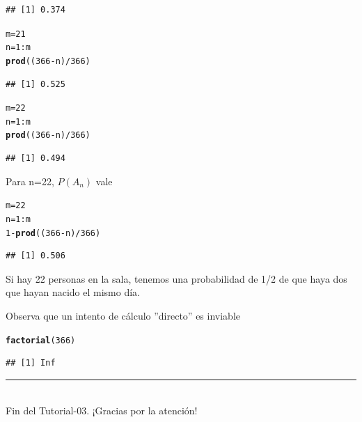 \documentclass[10pt,a4paper]{article}\usepackage[]{graphicx}\usepackage[]{color}
\makeatletter
\newcommand{\hlnum}[1]{\textcolor[rgb]{0.686,0.059,0.569}{#1}}%
\newcommand{\hlopt}[1]{\textcolor[rgb]{0,0,0}{#1}}%
\newcommand{\hlstd}[1]{\textcolor[rgb]{0.345,0.345,0.345}{#1}}%
\newcommand{\hlkwb}[1]{\textcolor[rgb]{0.69,0.353,0.396}{#1}}%
\newcommand{\hlkwd}[1]{\textcolor[rgb]{0.737,0.353,0.396}{\textbf{#1}}}%
\newenvironment{kframe}{%
 \def\at@end@of@kframe{}%
 \ifinner\ifhmode%
  \def\at@end@of@kframe{\end{minipage}}%
  \begin{minipage}{\columnwidth}%
 \fi\fi%
 \def\FrameCommand##1{\hskip\@totalleftmargin \hskip-\fboxsep
 \colorbox{shadecolor}{##1}\hskip-\fboxsep
     \hskip-\linewidth \hskip-\@totalleftmargin \hskip\columnwidth}%
 \MakeFramed {\advance\hsize-\width
   \@totalleftmargin\z@ \linewidth\hsize
   \@setminipage}}%
 {\par\unskip\endMakeFramed%
 \at@end@of@kframe}
\newenvironment{knitrout}{}{} %
\newcounter {cont01}
\makeatother
\begin{document}
\begin{knitrout}
\begin{kframe}
\begin{verbatim}
## [1] 0.374
\end{verbatim}
\begin{alltt}
\hlstd{m} \hlkwb{=}\hlnum{21}
\hlstd{n} \hlkwb{=} \hlnum{1}\hlopt{:}\hlstd{m}
\hlkwd{prod}\hlstd{((}\hlnum{366}\hlopt{-}\hlstd{n)}\hlopt{/}\hlnum{366}\hlstd{)}
\end{alltt}
\begin{verbatim}
## [1] 0.525
\end{verbatim}
\begin{alltt}
\hlstd{m} \hlkwb{=}\hlnum{22}
\hlstd{n} \hlkwb{=} \hlnum{1}\hlopt{:}\hlstd{m}
\hlkwd{prod}\hlstd{((}\hlnum{366}\hlopt{-}\hlstd{n)}\hlopt{/}\hlnum{366}\hlstd{)}
\end{alltt}
\begin{verbatim}
## [1] 0.494
\end{verbatim}
\end{kframe}
\end{knitrout}

Para n=22, $P(A_n)$ vale 
\begin{knitrout}
\color{fgcolor}\begin{kframe}
\begin{alltt}
\hlstd{m} \hlkwb{=}\hlnum{22}
\hlstd{n} \hlkwb{=} \hlnum{1}\hlopt{:}\hlstd{m}
\hlnum{1}\hlopt{-}\hlkwd{prod}\hlstd{((}\hlnum{366}\hlopt{-}\hlstd{n)}\hlopt{/}\hlnum{366}\hlstd{)}
\end{alltt}
\begin{verbatim}
## [1] 0.506
\end{verbatim}
\end{kframe}
\end{knitrout}
    
Si hay 22 personas en la sala, tenemos una probabilidad de 1/2 de que haya dos que hayan nacido el mismo d\'ia.
    
Observa que un intento de cálculo ''directo'' 
es inviable
\begin{knitrout}
\color{fgcolor}\begin{kframe}
\begin{alltt}
\hlkwd{factorial}\hlstd{(}\hlnum{366}\hlstd{)}
\end{alltt}


{\ttfamily\noindent\color{warningcolor}{\#\# Warning in factorial(366): value out of range in 'gammafn'}}\begin{verbatim}
## [1] Inf
\end{verbatim}
\end{kframe}
\end{knitrout}


\vspace{2cm} \hrule
\quad\\
Fin del Tutorial-03. ¡Gracias por la atención!


%
%
\end{document}

